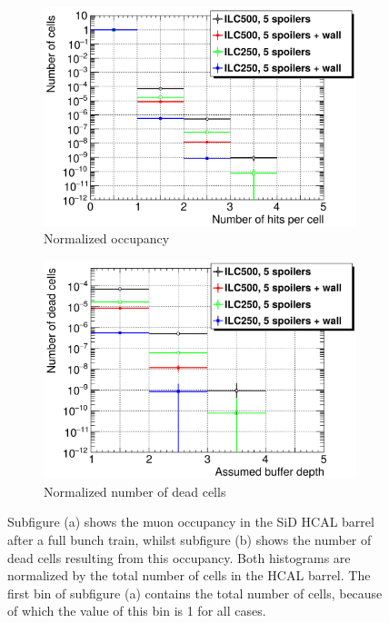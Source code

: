  \begin{figure}
 \centering
  \begin{subfigure}[b]{0.49\textwidth}
   \centering
    \includegraphics[width=\textwidth]{Figures/BDS_muons/Occupancy_Comparison_All_layers_wrt_cells_HcalBarrel.png}
   \caption{Normalized occupancy}
   \end{subfigure}
   \hfill
    \begin{subfigure}[b]{0.49\textwidth}
   \centering
    \includegraphics[width=\textwidth]{Figures/BDS_muons/Occupancy_Comparison_All_layers_deadcells_HcalBarrel.png}
   \caption{Normalized number of dead cells}
   \end{subfigure}
   \caption[SiD HCAL barrel occupancy from BDS muons]{Subfigure (a) shows the muon occupancy in the SiD HCAL barrel after a full bunch train, whilst subfigure (b) shows the number of dead cells resulting from this occupancy.
   Both histograms are normalized by the total number of cells in the HCAL barrel.
   The first bin of subfigure (a) contains the total number of cells, because of which the value of this bin is 1 for all cases.}
   \label{fig:BDS_Muons:HcalBarrel}
 \end{figure}
